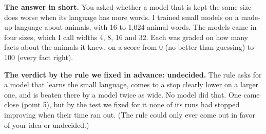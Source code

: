 \begin{keybox}
\textbf{The answer in short.} You asked whether a model that is kept the same size does worse
when its language has more words. I trained small models on a made-up language about animals,
with 16 to 1,024 animal words. The models came in four sizes, which I call widths 4, 8, 16 and
32. Each was graded on how many facts about the animals it knew, on a score from 0 (no better
than guessing) to 100 (every fact right).

\textbf{The verdict by the rule we fixed in advance: undecided.} The rule asks for a model
that learns the small language, comes to a stop clearly lower on a larger one, and is beaten
there by a model twice as wide. No model did that. One came close (point 5), but by the
test we fixed for it none of its runs had stopped improving when their time ran out. (The rule could only ever come out in favor of your idea or undecided.)


\end{keybox}
